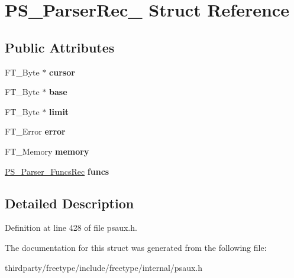 \hypertarget{struct_p_s___parser_rec__}{}\section{P\+S\+\_\+\+Parser\+Rec\+\_\+ Struct Reference}
\label{struct_p_s___parser_rec__}
\subsection*{Public Attributes}
\begin{DoxyCompactItemize}
\item 
\mbox{\label{struct_p_s___parser_rec___a6ed189bc25c03814bdafad63819ddfe7}} 
F\+T\+\_\+\+Byte $\ast$ {\bfseries cursor}
\item 
\mbox{\label{struct_p_s___parser_rec___a30528f6a9caffce2fd44ef2d5a38e5bd}} 
F\+T\+\_\+\+Byte $\ast$ {\bfseries base}
\item 
\mbox{\label{struct_p_s___parser_rec___af3310795fd73530036fb32ec4385ea3d}} 
F\+T\+\_\+\+Byte $\ast$ {\bfseries limit}
\item 
\mbox{\label{struct_p_s___parser_rec___a7a1432cb4d8bb603663f1258224c8ec4}} 
F\+T\+\_\+\+Error {\bfseries error}
\item 
\mbox{\label{struct_p_s___parser_rec___a3e2206deb6c0d73f51c8c71d5db1db1f}} 
F\+T\+\_\+\+Memory {\bfseries memory}
\item 
\mbox{\label{struct_p_s___parser_rec___a450031fd9e77e55bf424dc64a8d2659d}} 
\hyperlink{struct_p_s___parser___funcs_rec__}{P\+S\+\_\+\+Parser\+\_\+\+Funcs\+Rec} {\bfseries funcs}
\end{DoxyCompactItemize}


\subsection{Detailed Description}


Definition at line 428 of file psaux.\+h.



The documentation for this struct was generated from the following file\+:\begin{DoxyCompactItemize}
\item 
thirdparty/freetype/include/freetype/internal/psaux.\+h\end{DoxyCompactItemize}
